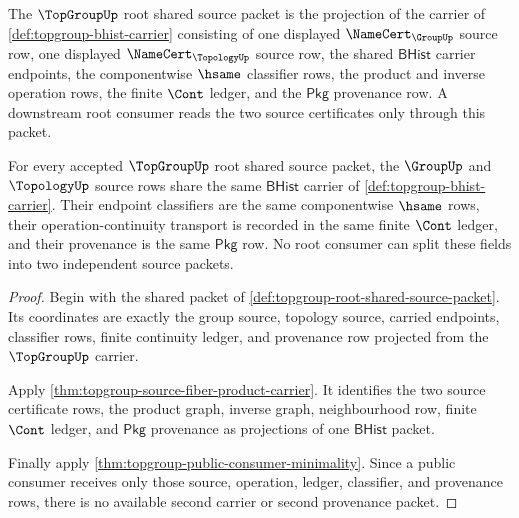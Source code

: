 \begin{definition}
\label{def:topgroup-root-shared-source-packet}
The $\TopGroupUp$ root shared source packet is the projection of the carrier
of \autoref{def:topgroup-bhist-carrier} consisting of one displayed
$\NameCert_{\GroupUp}$ source row, one displayed $\NameCert_{\TopologyUp}$
source row, the shared $\mathsf{BHist}$ carrier endpoints, the componentwise
$\hsame$ classifier rows, the product and inverse operation rows, the finite
$\Cont$ ledger, and the $\mathsf{Pkg}$ provenance row. A downstream root
consumer reads the two source certificates only through this packet.
\end{definition}

\begin{theorem}
\label{thm:topgroup-root-shared-carrier-obligation}
For every accepted $\TopGroupUp$ root shared source packet, the
$\GroupUp$ and $\TopologyUp$ source rows share the same $\mathsf{BHist}$
carrier of \autoref{def:topgroup-bhist-carrier}. Their endpoint classifiers
are the same componentwise $\hsame$ rows, their operation-continuity transport
is recorded in the same finite $\Cont$ ledger, and their provenance is the
same $\mathsf{Pkg}$ row. No root consumer can split these fields into two
independent source packets.
\end{theorem}
\begin{proof}
Begin with the shared packet of
\autoref{def:topgroup-root-shared-source-packet}. Its coordinates are exactly
the group source, topology source, carried endpoints, classifier rows, finite
continuity ledger, and provenance row projected from the $\TopGroupUp$
carrier.

Apply \autoref{thm:topgroup-source-fiber-product-carrier}. It identifies the
two source certificate rows, the product graph, inverse graph, neighbourhood
row, finite $\Cont$ ledger, and $\mathsf{Pkg}$ provenance as projections of
one $\mathsf{BHist}$ packet.

Finally apply \autoref{thm:topgroup-public-consumer-minimality}. Since a
public consumer receives only those source, operation, ledger, classifier, and
provenance rows, there is no available second carrier or second provenance
packet.
\end{proof}


